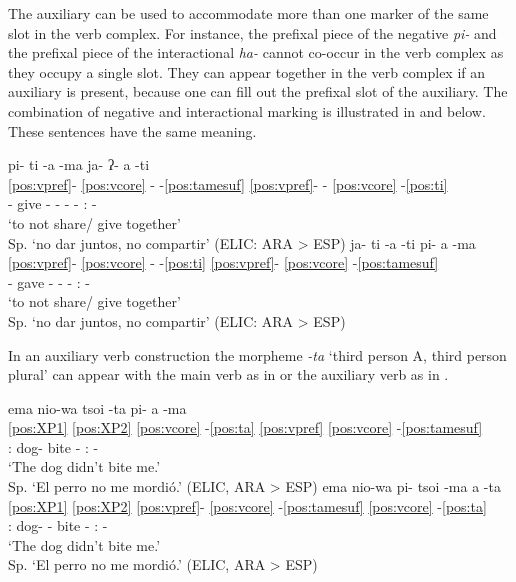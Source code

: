 \documentclass[output=paper,hidelinks]{langscibook}
\begin{document}
The auxiliary can be used to accommodate more than one marker of the same slot in the verb complex. For instance, the prefixal piece of the negative \textit{pi-} and the prefixal piece of the interactional \textit{ha-} cannot co-occur in the verb complex as they occupy a single slot. They can appear together in the verb complex if an auxiliary is present, because one can fill out the prefixal slot of the auxiliary. The combination of negative and interactional marking is illustrated in  and  below. These sentences have the same meaning.

\ea 
 \ea\label{ex:pitiamaja-ati}
    \glll pi- ti -a -ma ja- ʔ- a -ti  \\
    \ref{pos:vpref}- \ref{pos:vcore} - -\ref{pos:tamesuf} \ref{pos:vpref}- - \ref{pos:vcore} -\ref{pos:ti}   \\
    \Neg{}- give -\E{} -\Neg{} \Intrc{}- \E{}- \Aux{}:\Tr{} -\Intrc{}    \\
    \glt `to not share/ give together' \\ Sp. `no dar juntos, no compartir'  \hfill (ELIC: ARA > ESP)
 \ex \label{ex:jatiatipiama}
    \glll ja- ti -a -ti pi- a -ma  \\
    \ref{pos:vpref}- \ref{pos:vcore} - -\ref{pos:ti} \ref{pos:vpref}- \ref{pos:vcore} -\ref{pos:tamesuf}     \\
    \Intrc{}- gave -\E{} -\Intrc{} \Neg{}- \Aux{}:\Tr{} -\Neg{} \\
    \glt `to not share/ give together' \\ Sp. `no dar juntos, no compartir'  \hfill (ELIC: ARA > ESP)
 \z
\z 


In an auxiliary verb construction the morpheme \textit{-ta} `third person A, third person plural' can appear with the main verb as in  or the auxiliary verb as in .

\ea 
 \ea \label{ex:tsoitapiama}
    \glll ema nio-wa tsoi -ta pi- a -ma  \\
    \ref{pos:XP1} \ref{pos:XP2} \ref{pos:vcore} -\ref{pos:ta} \ref{pos:vpref} \ref{pos:vcore} -\ref{pos:tamesuf}  \\
    \Fsg{}:\Abs{} dog-\Erg{} bite -\Third\Aarg{} \Neg{} \Aux{}:\Tr{} -\Neg{}  \\
    \glt `The dog didn't bite me.' \\ Sp. `El perro no me mordió.'  \hfill (ELIC, ARA > ESP)
 \ex \label{ex:pitsoimaata}
    \glll ema nio-wa pi- tsoi -ma a -ta  \\
    \ref{pos:XP1} \ref{pos:XP2} \ref{pos:vpref}- \ref{pos:vcore} -\ref{pos:tamesuf} \ref{pos:vcore} -\ref{pos:ta} \\
    \Fsg{}:\Abs{} dog-\Erg{} \Neg{}- bite -\Neg{} \Aux{}:\Tr{} -\Third\Aarg{} \\
    \glt `The dog didn't bite me.' \\ Sp. `El perro no me mordió.'  \hfill (ELIC, ARA > ESP)
 \z
\z 
\end{document}
